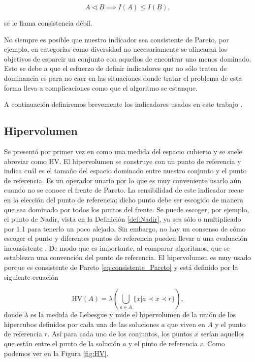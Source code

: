 \begin{equation} \label{eq:consistente_debil_Pareto}
    A \vartriangleleft B \implies I(A)\leq I(B),
\end{equation}

se le llama consistencia débil.

No siempre es posible que nuestro indicador sea consistente de Pareto, por ejemplo, en categorías como diversidad no necesariamente se alinearan los objetivos de esparcir un conjunto con aquellos de encontrar uno menos dominado. Esto se debe a que el esfuerzo de definir indicadores que no sólo traten de dominancia es para no caer en las situaciones donde tratar el problema de esta forma lleva a complicaciones como que el algoritmo se estanque.

A continuación definiremos brevemente los indicadores usados en este trabajo .

\subsection{Hipervolumen} \label{sec:HV}

Se presentó por primer vez en \cite{zitzlerMultiobjectiveOptimizationUsing1998} como una medida del espacio cubierto y se suele abreviar como HV. 
El hipervolumen se construye con un punto de referencia y indica cuál es el tamaño del espacio dominado entre nuestro conjunto y el punto de referencia. Es un operador unario por lo que es muy conveniente usarlo aún cuando no se conoce el frente de Pareto. La sensibilidad de este indicador recae en la elección del punto de referencia; dicho  punto debe ser escogido de manera que sea dominado por todos los puntos del frente. Se puede escoger, por ejemplo, el punto de Nadir, vista en la Definición \ref{def:Nadir}, ya sea sólo o multiplicado por 1.1 para tenerlo un poco alejado. Sin embargo, no hay un consenso de cómo escoger el punto y diferentes puntos de referencia pueden llevar a una evaluación inconsistente \cite{HV_ref_point}. De modo que es importante, al comparar algoritmos, que se establezca una convención del punto de referencia. El hipervolumen es muy usado porque es consistente de Pareto \eqref{eq:consistente_Pareto} y está definido por la siguiente ecuación 

\begin{equation} \label{eq:HV}
    \text{HV}(A)=\lambda\left( \bigcup_{a\in A} \{x|a \prec x \prec r \} \right), \nonumber
\end{equation}
donde $\lambda$ es la medida de Lebesgue y mide el hipervolumen de la unión de los hipercubos definidos por cada una de las soluciones $a$ que viven en $A$ y el punto de referencia $r$. Así para cada uno de los conjuntos, los puntos $x$ serían aquellos que están entre el punto de la solución $a$ y el pinto de referencia $r$. Como podemos ver en la Figura \ref{fig:HV}.

